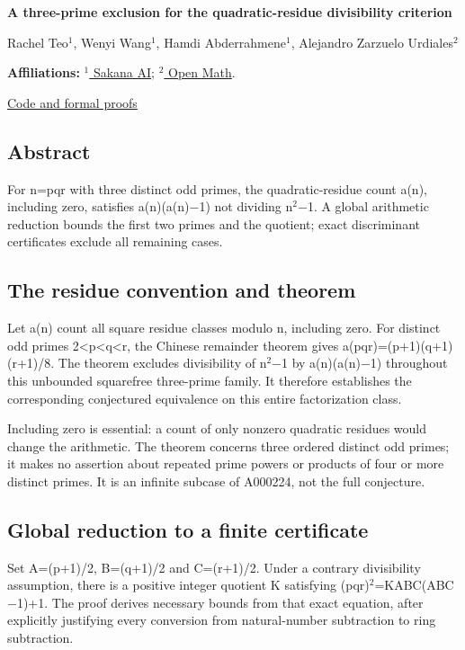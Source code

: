 \documentclass[11pt,a4paper]{article}
\begin{document}
{\LARGE\bfseries A three-prime exclusion for the quadratic-residue divisibility criterion\par}\medskip
{\small Rachel Teo\ensuremath{^1}, Wenyi Wang\ensuremath{^1}, Hamdi Abderrahmene\ensuremath{^1}, Alejandro Zarzuelo Urdiales\ensuremath{^2}\par}\medskip
{\small\textbf{Affiliations:} \href{https://sakana.ai/}{\ensuremath{^1} Sakana AI}; \href{https://rsihouse.ai/openmath}{\ensuremath{^2} Open Math}.\par}

{\small\href{https://github.com/alejandrozu/openmath-2026-judging}{Code and formal proofs}\par}

\subsection{Abstract}
For n=pqr with three distinct odd primes, the quadratic-residue count a(n), including zero, satisfies a(n)(a(n)\ensuremath{-}1) not dividing n\ensuremath{^2}\ensuremath{-}1. A global arithmetic reduction bounds the first two primes and the quotient; exact discriminant certificates exclude all remaining cases.

\subsection{The residue convention and theorem}
Let a(n) count all square residue classes modulo n, including zero. For distinct odd primes 2<p<q<r, the Chinese remainder theorem gives a(pqr)=(p+1)(q+1)(r+1)/8. The theorem excludes divisibility of n\ensuremath{^2}\ensuremath{-}1 by a(n)(a(n)\ensuremath{-}1) throughout this unbounded squarefree three-prime family. It therefore establishes the corresponding conjectured equivalence on this entire factorization class.

Including zero is essential: a count of only nonzero quadratic residues would change the arithmetic. The theorem concerns three ordered distinct odd primes; it makes no assertion about repeated prime powers or products of four or more distinct primes. It is an infinite subcase of A000224, not the full conjecture.

\subsection{Global reduction to a finite certificate}
Set A=(p+1)/2, B=(q+1)/2 and C=(r+1)/2. Under a contrary divisibility assumption, there is a positive integer quotient K satisfying (pqr)\ensuremath{^2}=KABC(ABC\ensuremath{-}1)+1. The proof derives necessary bounds from that exact equation, after explicitly justifying every conversion from natural-number subtraction to ring subtraction.
\end{document}

